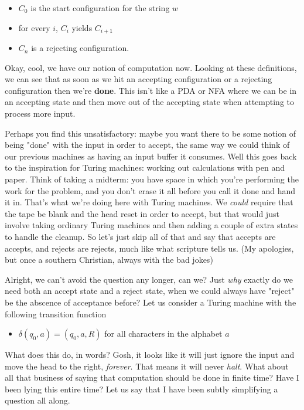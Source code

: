 \documentclass[11pt]{article}
\begin{document}
\begin{itemize}
\item $C_0$ is the start configuration for the string $w$
\item for every $i$, $C_i$ yields $C_{i+1}$
\item $C_n$ is a rejecting configuration.
\end{itemize}

Okay, cool, we have our notion of computation now. Looking at these definitions, we can see that as soon as we hit an accepting configuration or a rejecting configuration then we're \textbf{done}. This isn't like a PDA or NFA where we can be in an accepting state and then move out of the accepting state when attempting to process more input. 

Perhaps you find this unsatisfactory: maybe you want there to be some notion of being "done" with the input in order to accept, the same way we could think of our previous machines as having an input buffer it consumes. Well this goes back to the inspiration for Turing machines: working out calculations with pen and paper. Think of taking a midterm: you have space in which you're performing the work for the problem, and you don't erase it all before you call it done and hand it in. That's what we're doing here with Turing machines. We \emph{could} require that the tape be blank and the head reset in order to accept, but that would just involve taking ordinary Turing machines and then adding a couple of extra states to handle the cleanup. So let's just skip all of that and say that accepts are accepts, and rejects are rejects, much like what scripture tells us. (My apologies, but once a southern Christian, always with the bad jokes)

Alright, we can't avoid the question any longer, can we? Just \emph{why} exactly do we need both an accept state and a reject state, when we could always have "reject" be the abscence of acceptance before? Let us consider a Turing machine with the following transition function

\begin{itemize}
\item $\delta (q_0,a) = (q_0,a,R)$ for all characters in the alphabet $a$
\end{itemize}

What does this do, in words? Gosh, it looks like it will just ignore the input and move the head to the right, \emph{forever}. That means it will never \emph{halt}. What about all that business of saying that computation should be done in finite time? Have I been lying this entire time? Let us say that I have been subtly simplifying a question all along. 
\end{document}

